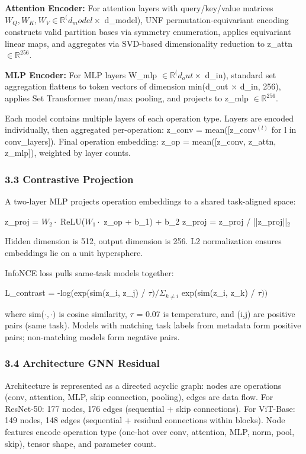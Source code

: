 \textbf{Attention Encoder:} For attention layers with query/key/value matrices $W_Q, W_K, W_V \in \mathbb{R}^(d_model \times$ d\_model), UNF permutation-equivariant encoding constructs valid partition bases via symmetry enumeration, applies equivariant linear maps, and aggregates via SVD-based dimensionality reduction to z\_attn $\in \mathbb{R}^256$.

\textbf{MLP Encoder:} For MLP layers W\_mlp $\in \mathbb{R}^(d_out \times$ d\_in), standard set aggregation flattens to token vectors of dimension min(d\_out $\times$ d\_in, 256), applies Set Transformer mean/max pooling, and projects to z\_mlp $\in \mathbb{R}^256$.

Each model contains multiple layers of each operation type. Layers are encoded individually, then aggregated per-operation: z\_conv = mean([z\_conv$^{(l)}$ for l in conv\_layers]). Final operation embedding: z\_op = mean([z\_conv, z\_attn, z\_mlp]), weighted by layer counts.

\subsubsection{3.3 Contrastive Projection}

A two-layer MLP projects operation embeddings to a shared task-aligned space:

z\_proj = $W_2 \cdot$ ReLU($W_1 \cdot$ z\_op + b\_1) + b\_2  
z\_proj = z\_proj / ||z\_proj||$_2$

Hidden dimension is 512, output dimension is 256. L2 normalization ensures embeddings lie on a unit hypersphere.

InfoNCE loss pulls same-task models together:

L\_contrast = -log(exp(sim(z\_i, z\_j) / $\tau ) / \Sigma _{k\neq i}$ exp(sim(z\_i, z\_k) / $\tau ))$

where sim($\cdot ,\cdot )$ is cosine similarity, $\tau$ = 0.07 is temperature, and (i,j) are positive pairs (same task). Models with matching task labels from metadata form positive pairs; non-matching models form negative pairs.

\subsubsection{3.4 Architecture GNN Residual}

Architecture is represented as a directed acyclic graph: nodes are operations (conv, attention, MLP, skip connection, pooling), edges are data flow. For ResNet-50: 177 nodes, 176 edges (sequential + skip connections). For ViT-Base: 149 nodes, 148 edges (sequential + residual connections within blocks). Node features encode operation type (one-hot over {conv, attention, MLP, norm, pool, skip}), tensor shape, and parameter count.

